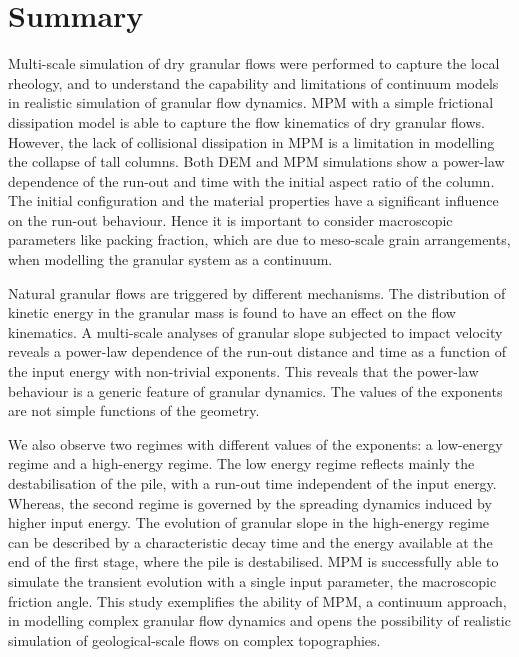 \section{Summary}

Multi-scale simulation of dry granular flows were performed to capture the 
local rheology, and to understand the capability and limitations of continuum 
models in realistic simulation of granular flow dynamics. MPM with a simple 
frictional dissipation model is able to capture the flow kinematics of dry 
granular flows. However, the lack of collisional dissipation in MPM is a 
limitation in modelling the collapse of tall columns. Both DEM and MPM 
simulations show a power-law dependence of the run-out and time with the 
initial aspect ratio of the column. The initial configuration and the material 
properties have a significant influence on the run-out behaviour. Hence it is 
important to consider macroscopic parameters like packing fraction, which are 
due to meso-scale grain arrangements, when modelling the granular system as a 
continuum.

Natural granular flows are triggered by different mechanisms. The distribution 
of kinetic energy in the granular mass is found to have an effect on the flow 
kinematics. A multi-scale analyses of granular slope subjected to impact 
velocity reveals a power-law dependence of the run-out distance and time as a 
function of the input energy with non-trivial exponents. This reveals that the 
power-law behaviour is a generic feature of granular dynamics. The values of 
the exponents are not simple functions of the geometry. 

We also observe two regimes with different values of the exponents: 
a low-energy regime and a high-energy regime. The low energy regime reflects 
mainly the destabilisation of the pile, with a run-out time independent of the 
input energy. Whereas, the second regime is governed by the spreading dynamics 
induced by higher input energy. The evolution of granular slope in the 
high-energy regime can be described by a characteristic decay time and the 
energy available at the end of the first stage, where the pile is destabilised. 
MPM is successfully able to simulate the transient evolution with a single 
input parameter, the macroscopic friction angle. This study exemplifies the 
ability of MPM, a continuum approach,  in modelling complex granular flow 
dynamics and opens the possibility of realistic simulation of geological-scale 
flows on complex topographies.
